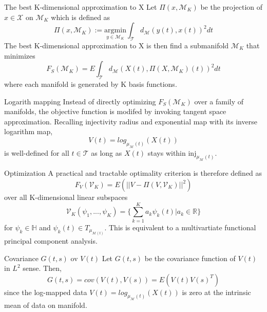 \documentclass{beamer}
\begin{document}
\begin{frame}{The best K-dimensional approximation to X}
Let $\Pi(x,\mathcal{M}_{K})$ be the projection of $x\in\mathcal{X}$ on $\mathcal{M}_{K}$ which is defined as
\begin{equation*}
       \Pi(x,\mathcal{M}_{K}):= \underset{y\in\mathcal{M}_{K}}{\text{argmin}}\int_{\mathcal{T}}d_{\mathcal{M}}(y(t),x(t))^{2}dt
\end{equation*}
The best K-dimensional approximation to X is then find a submanifold $\mathcal{M}_{K}$ that minimizes
\begin{equation*}
F_{S}(\mathcal{M}_{K}) = E\int_{\mathcal{T}}d_{\mathcal{M}}(X(t),\Pi(X,\mathcal{M}_{K})(t))^{2}dt
\end{equation*}
where each manifold is generated by K basis functions.
\end{frame}

\begin{frame}{Logarith mapping}
Instead of directly optimizing $F_{S}(\mathcal{M}_{K})$ over a family of manifolds, the objective function is modifed by invoking tangent space approximation. Recalling injectivity radius and exponential map with its inverse logarithm map,
\begin{equation*}
V(t) = log_{\mu_{\mathcal{M}}(t)}(X(t))
\end{equation*}
is well-defined for all $t\in\mathcal{T}$ as long as $X(t)$ stays within $\text{inj}_{\mu_{\mathcal{M}}(t)}$.

\end{frame}

\begin{frame}{Optimization}
A practical and tractable optimality criterion is therefore defined as
\begin{equation*}
    F_{V}(\mathcal{V}_{K}) = E(||V - \Pi(V,\mathcal{V}_{K})  ||^{2})
\end{equation*}
over all K-dimensional linear subspaces
\begin{equation*}
 \mathcal{V}_{K}(\psi_{1},...,\psi_{K}) = \{\sum_{k=1}^{K}a_{k}\psi_{k}(t)|a_{k}\in\mathbb{R}\}
\end{equation*}
for $\psi_{k} \in \mathbb{H}$ and $\psi_{k}(t) \in T_{\mu_{\mathcal{M}(t)}}$. This is equivalent to a multivartiate functional principal component analysis.
\end{frame}

\begin{frame}{Covariance $G(t,s)$ ov $V(t)$}
Let $G(t,s)$ be the covariance function of $V(t)$ in $L^{2}$ sense. Then,
\begin{equation*}
G(t,s) = cov(V(t),V(s)) = E(V(t)V(s)^{T})
\end{equation*}
since the log-mapped data $V(t) = log_{\mu_{\mathcal{M}}(t)}(X(t))$ is zero at the intrinsic mean of data on manifold.
\end{frame}
\end{document}
